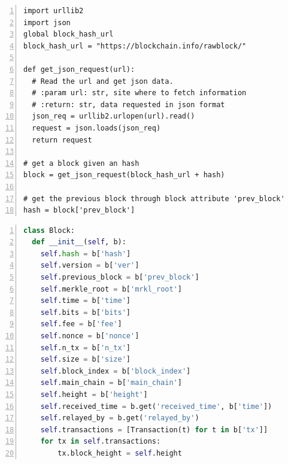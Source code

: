 \documentclass[USenglish]{uit-thesis}
\begin{document}
\begin{appendices}
\begin{lstlisting}[numbers=left,frame=single,caption={Data retrieval using \gls{rest}ful \gls{api}s provided from \url{blockchain.info}.}]
import urllib2
import json
global block_hash_url
block_hash_url = "https://blockchain.info/rawblock/"

def get_json_request(url):
  # Read the url and get json data.
  # :param url: str, site where to fetch information
  # :return: str, data requested in json format
  json_req = urllib2.urlopen(url).read()
  request = json.loads(json_req)
  return request

# get a block given an hash
block = get_json_request(block_hash_url + hash)

# get the previous block through block attribute 'prev_block'
hash = block['prev_block']
\end{lstlisting}


\begin{lstlisting}[float, numbers=left,frame=single,caption={Block object structure obtained using Bitcoin's \gls{api}s},language=Python]
class Block:
  def __init__(self, b):
    self.hash = b['hash']
    self.version = b['ver']
    self.previous_block = b['prev_block']
    self.merkle_root = b['mrkl_root']
    self.time = b['time']
    self.bits = b['bits']
    self.fee = b['fee']
    self.nonce = b['nonce']
    self.n_tx = b['n_tx']
    self.size = b['size']
    self.block_index = b['block_index']
    self.main_chain = b['main_chain']
    self.height = b['height']
    self.received_time = b.get('received_time', b['time'])
    self.relayed_by = b.get('relayed_by')
    self.transactions = [Transaction(t) for t in b['tx']]
    for tx in self.transactions:
        tx.block_height = self.height
\end{lstlisting}




\end{appendices}
\end{document}
